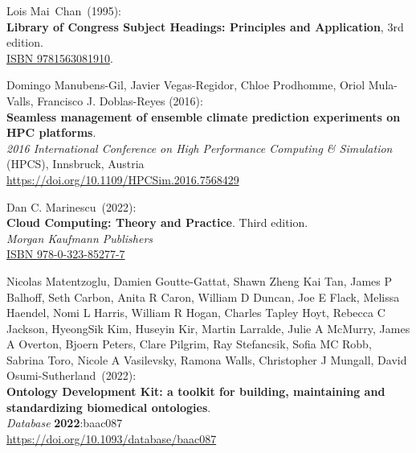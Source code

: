 \begin{thebibliography}{9}
Lois Mai~Chan~(1995): \\
\textbf{Library of Congress Subject Headings: Principles and Application}, 3rd edition.\\
\href{https://identifiers.org/isbn/9781563081910}{ISBN 9781563081910}.

Domingo Manubens-Gil, Javier Vegas-Regidor, Chloe Prodhomme, Oriol Mula-Valls, Francisco J. Doblas-Reyes (2016): \\
\textbf{Seamless management of ensemble climate prediction experiments on HPC platforms}.\\
\emph{2016 International Conference on High Performance Computing \& Simulation} (HPCS), Innsbruck, Austria \\
\url{https://doi.org/10.1109/HPCSim.2016.7568429}

Dan C. Marinescu~(2022): \\
\textbf{Cloud Computing: Theory and Practice}.
Third edition.\\
\emph{Morgan Kaufmann Publishers}\\
\href{https://identifiers.org/isbn/9780323852777}{ISBN 978-0-323-85277-7}

Nicolas Matentzoglu, Damien Goutte-Gattat, Shawn Zheng Kai Tan, James P Balhoff, Seth Carbon, Anita R Caron, William D Duncan, Joe E Flack, Melissa Haendel, Nomi L Harris, William R Hogan, Charles Tapley Hoyt, Rebecca C Jackson, HyeongSik Kim, Huseyin Kir, Martin Larralde, Julie A McMurry, James A Overton, Bjoern Peters, Clare Pilgrim, Ray Stefancsik, Sofia MC Robb, Sabrina Toro, Nicole A Vasilevsky, Ramona Walls, Christopher J Mungall, David Osumi-Sutherland~(2022): \\
\textbf{Ontology Development Kit: a toolkit for building, maintaining and standardizing biomedical ontologies}.\\
\emph{Database} \textbf{2022}:baac087 \\
\url{https://doi.org/10.1093/database/baac087}


\end{thebibliography}
